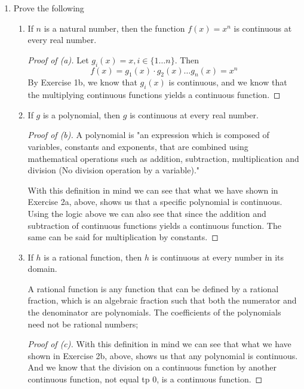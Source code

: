\documentclass{article} %
\theoremstyle{plain}
\theoremstyle{definition}
\theoremstyle{case}
\begin{document}
\begin{enumerate}[label={\fbox{\textbf{Exercise \#\arabic* :}}}]
\begin{enumerate}
\begin{proof}[Proof of (b)]
        \end{proof}
    \end{enumerate}



\newpage

\item Prove the following
  \begin{enumerate}
    \item If $n$ is a natural number, then the function $f(x) = x^n$ is
      continuous at every real number.

        \begin{proof}[Proof of (a)]
          Let $g_i(x) = x, i \in \{1\dots n\}$.  Then
            \[ f(x) = g_1(x) \cdot g_2(x) \dots g_n(x) = x^n \]
            By Exercise 1b, we know that $g_i(x)$ is continuous, and we 
            know that the multiplying continuous functions yields a 
            continuous function.
        \end{proof}

    \item If $g$ is a polynomial, then $g$ is continuous at every real number.
        \begin{proof}[Proof of (b)]
          A polynomial is "an expression which is composed of variables,
          constants and exponents, that are combined using mathematical
          operations such as addition, subtraction, multiplication and
          division (No division operation by a variable)."

          With this definition in mind we can see that what we have
          shown in Exercise 2a, above, shows us that a specific polynomial
          is continuous.  Using the logic above we can also see that 
          since the addition and subtraction of continuous functions yields
          a continuous function.  The same can be said for multiplication
          by constants.
        \end{proof}

    \item If $h$ is a rational function, then $h$ is continuous at every number in its domain.

        A rational function is any function that can be defined by a rational fraction, which is an algebraic fraction such that both the numerator and the denominator are polynomials. The coefficients of the polynomials need not be rational numbers; 

        \begin{proof}[Proof of (c)]
          With this definition in mind we can see that what we have
          shown in Exercise 2b, above, shows us that any polynomial is
          continuous.  And we know that the division on a continuous
          function by another continuous function, not equal tp 0, is a
          continuous function.
        \end{proof}
  \end{enumerate}




\end{enumerate}
\end{document}
